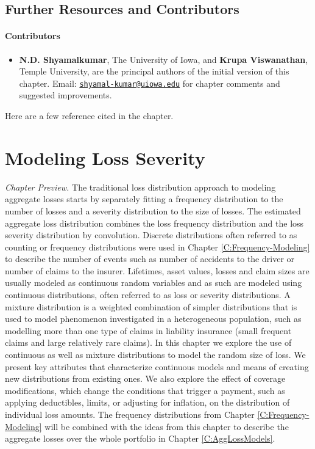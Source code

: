 \documentclass[]{book}
\providecommand{\tightlist}{%
  \setlength{\itemsep}{0pt}\setlength{\parskip}{0pt}}
\theoremstyle{definition}
\theoremstyle{definition}
\theoremstyle{definition}
\theoremstyle{remark}
\begin{document}
\section{Further Resources and
Contributors}\label{Freq-further-reading-and-resources}

\subsubsection*{Contributors}\label{contributors-1}

\begin{itemize}
\tightlist
\item
  \textbf{N.D. Shyamalkumar}, The University of Iowa, and \textbf{Krupa
  Viswanathan}, Temple University, are the principal authors of the
  initial version of this chapter. Email:
  \href{mailto:shyamal-kumar@uiowa.edu}{\nolinkurl{shyamal-kumar@uiowa.edu}}
  for chapter comments and suggested improvements.
\end{itemize}

Here are a few reference cited in the chapter.

\chapter{Modeling Loss Severity}\label{C:Severity}

\emph{Chapter Preview.} The traditional loss distribution approach to
modeling aggregate losses starts by separately fitting a frequency
distribution to the number of losses and a severity distribution to the
size of losses. The estimated aggregate loss distribution combines the
loss frequency distribution and the loss severity distribution by
convolution. Discrete distributions often referred to as counting or
frequency distributions were used in Chapter \ref{C:Frequency-Modeling}
to describe the number of events such as number of accidents to the
driver or number of claims to the insurer. Lifetimes, asset values,
losses and claim sizes are usually modeled as continuous random
variables and as such are modeled using continuous distributions, often
referred to as loss or severity distributions. A mixture distribution is
a weighted combination of simpler distributions that is used to model
phenomenon investigated in a heterogeneous population, such as modelling
more than one type of claims in liability insurance (small frequent
claims and large relatively rare claims). In this chapter we explore the
use of continuous as well as mixture distributions to model the random
size of loss. We present key attributes that characterize continuous
models and means of creating new distributions from existing ones. We
also explore the effect of coverage modifications, which change the
conditions that trigger a payment, such as applying deductibles, limits,
or adjusting for inflation, on the distribution of individual loss
amounts. The frequency distributions from Chapter
\ref{C:Frequency-Modeling} will be combined with the ideas from this
chapter to describe the aggregate losses over the whole portfolio in
Chapter \ref{C:AggLossModels}.
\end{document}
